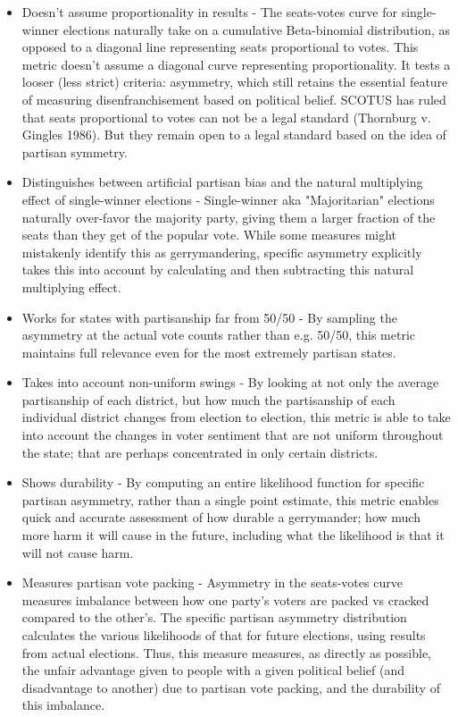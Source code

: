 \documentclass[preprint,12pt]{article}
\begin{document}
\begin{itemize}

\item Doesn't assume proportionality in results - The seats-votes curve for single-winner elections naturally take on a cumulative Beta-binomial distribution, as opposed to a diagonal line representing seats proportional to votes.  This metric doesn't assume a diagonal curve representing proportionality.  It tests a looser (less strict) criteria: asymmetry, which still retains the essential feature of measuring disenfranchisement based on political belief.  SCOTUS has ruled that seats proportional to votes can not be a legal standard (Thornburg v. Gingles 1986).   But they remain open to a legal standard based on the idea of partisan symmetry.
 
\item Distinguishes between artificial partisan bias and the natural multiplying effect of single-winner elections -  Single-winner aka "Majoritarian" elections naturally over-favor the majority party, giving them a larger fraction of the seats than they get of the popular vote.  While some measures might mistakenly identify this as gerrymandering, specific asymmetry explicitly takes this into account by calculating and then subtracting this natural multiplying effect.
 
\item Works for states with partisanship far from 50/50 - By sampling the asymmetry at the actual vote counts rather than e.g. 50/50, this metric maintains full relevance even for the most extremely partisan states.
 
\item Takes into account non-uniform swings - By looking at not only the average partisanship of each district, but how much the partisanship of each individual district changes from election to election, this metric is able to take into account the changes in voter sentiment that are not uniform throughout the state; that are perhaps concentrated in only certain districts.

\item Shows durability - By computing an entire likelihood function for specific partisan asymmetry, rather than a single point estimate, this metric enables quick and accurate assessment of how durable a gerrymander; how much more harm it will cause in the future, including what the likelihood is that it will not cause harm.
 
\item Measures partisan vote packing - Asymmetry in the seats-votes curve measures imbalance between how one party's voters are packed vs cracked compared to the other's. The specific partisan asymmetry distribution calculates the various likelihoods of that for future elections, using results from actual elections.  Thus, this measure measures, as directly as possible, the unfair advantage given to people with a given political belief (and disadvantage to another) due to partisan vote packing, and the durability of this imbalance.


\end{itemize}
\end{document}
